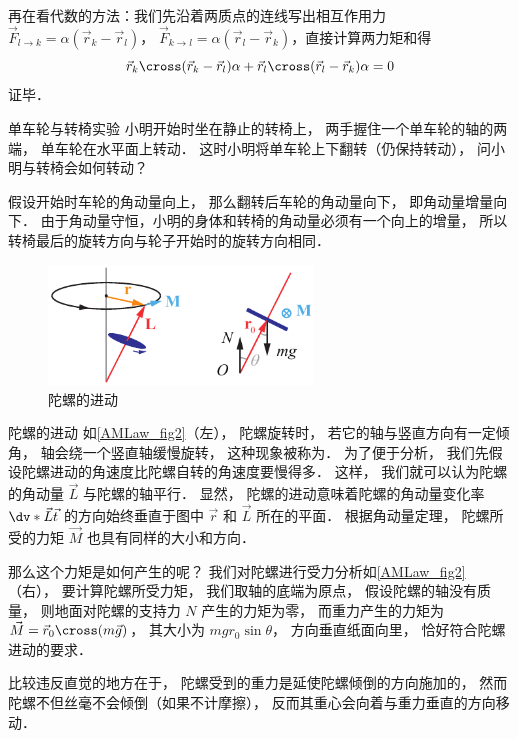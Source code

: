 再在看代数的方法：我们先沿着两质点的连线写出相互作用力 $\vec F_{l\to k} = \alpha(\vec r_k - \vec r_l)$， $\vec F_{k\to l} = \alpha(\vec r_l - \vec r_k)$，直接计算两力矩和得
\begin{equation}
\vec r_k \cross (\vec r_k - \vec r_l)\alpha + \vec r_l \cross (\vec r_l - \vec r_k)\alpha = 0
\end{equation}
证毕．

\begin{exam}{单车轮与转椅实验}
小明开始时坐在静止的转椅上， 两手握住一个单车轮的轴的两端， 单车轮在水平面上转动． 这时小明将单车轮上下翻转（仍保持转动）， 问小明与转椅会如何转动？

假设开始时车轮的角动量向上， 那么翻转后车轮的角动量向下， 即角动量增量向下． 由于角动量守恒，小明的身体和转椅的角动量必须有一个向上的增量， 所以转椅最后的旋转方向与轮子开始时的旋转方向相同．
\end{exam}

\begin{figure}[ht]
\centering
\includegraphics[width=7cm]{./figures/AMLaw2.pdf}
\caption{陀螺的进动}\label{AMLaw_fig2}
\end{figure}

\begin{exam}{陀螺的进动}\label{AMLaw_ex2}
如\autoref{AMLaw_fig2}（左）， 陀螺旋转时， 若它的轴与竖直方向有一定倾角， 轴会绕一个竖直轴缓慢旋转， 这种现象被称为． 为了便于分析， 我们先假设陀螺进动的角速度比陀螺自转的角速度要慢得多． 这样， 我们就可以认为陀螺的角动量 $\vec L$ 与陀螺的轴平行． 显然， 陀螺的进动意味着陀螺的角动量变化率 $\dv*{\vec L}{\vec t}$ 的方向始终垂直于图中 $\vec r$ 和 $\vec L$ 所在的平面． 根据角动量定理， 陀螺所受的力矩 $\vec M$ 也具有同样的大小和方向．

那么这个力矩是如何产生的呢？ 我们对陀螺进行受力分析如\autoref{AMLaw_fig2}（右）， 要计算陀螺所受力矩， 我们取轴的底端为原点， 假设陀螺的轴没有质量， 则地面对陀螺的支持力 $N$ 产生的力矩为零， 而重力产生的力矩为 $\vec M = \vec r_0 \cross (m\vec g)$， 其大小为 $mgr_0\sin\theta$， 方向垂直纸面向里， 恰好符合陀螺进动的要求．

比较违反直觉的地方在于， 陀螺受到的重力是延使陀螺倾倒的方向施加的， 然而陀螺不但丝毫不会倾倒（如果不计摩擦）， 反而其重心会向着与重力垂直的方向移动．
\end{exam}